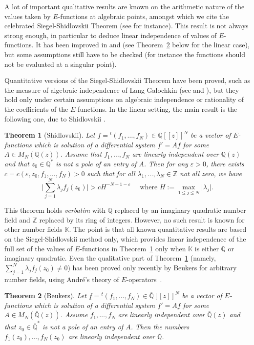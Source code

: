 \documentclass[JEP,XML,SOM,Unicode,published]{cedram}
\newcommand{\lcr}{[\![}
\newcommand{\rcr}{]\!]}
\newcommand{\Efunctions}{$E$\nobreakdash-func\-tions\xspace}
\newtheorem{thmx}{Theorem}
\theoremstyle{definition}
\newcommand{\tra}{{}^t}
\newcommand{\Q}{\mathbb{Q}}
\newcommand{\K}{\mathbb{K}}
\newcommand{\Qbar}{\overline{\mathbb Q}}
\begin{document}
A lot of important qualitative results are known on the arithmetic nature of the values taken by \Efunctions at algebraic points, amongst which we cite the celebrated Siegel-Shidlovskii Theorem (see \cite{Shidlovskiilivre} for instance). This result is not always strong enough, in particular to deduce linear independence of values of \Efunctions. It has been improved in \cite{ns} and \cite{beukers} (see Theorem~\ref{thbeukers} below for the linear case), but some assump\-tions still have to be checked (for instance the functions should not be
evaluated at a singular point).

Quantitative versions of the Siegel-Shidlovskii Theorem have been proved, such as the measure of algebraic independence of Lang-Galochkin (see \cite[p.\,238, Th.\,5.29 \& remarks]{EMS} and \cite[Ch.\,11]{Shidlovskiilivre}), but they hold only under certain assumptions on algebraic independence or rationality of the coefficients of the \Efunctions.
In the linear setting, the main result is the following one, due to Shidlovskii \cite[p.\,358, Th.\,1, Eq.\,(32)]{Shidlovskiilivre}.
\begin{thmx}[Shidlovskii] \label{thshid}
Let $\underline f = \tra (f_1,\ldots, f_N) \in \mathbb{Q}\lcr z\rcr^N$ be a vector of $E$\nobreakdash-func\-tions which is solution of a differential system $\underline f '=A\underline f $ for some $A\in M_N(\Q(z))$. Assume that $f_1,\ldots, f_N$ are linearly independent over $\Q(z)$ and that $z_0\in \mathbb Q^*$ is not a pole of an entry of $A$. Then for any $\varepsilon>0$, there exists $c=c(\varepsilon,z_0,f_1,\ldots,f_N)>0$ such that for all $\lambda_1, \ldots, \lambda_N \in \mathbb Z$ not all zero, we have
\[
\bigg\vert \sum_{j=1}^N \lambda_j f_j(z_0)\bigg\vert > c H^{-N+1-\varepsilon} \quad\mbox{ where } H:=\max_{1\leq j \leq N}\vert\lambda_j\vert.
\]
\end{thmx}
This theorem holds {\em verbatim} with $\mathbb Q$ replaced by an imaginary quadratic number field and $\mathbb Z$ replaced by its ring of integers. However, no such result is known for other number fields $\K$. The point is that all known quantitative results are based on the Siegel-Shidlovskii method only, which provides linear independence of the full set of the values of \Efunctions in Theorem~\ref{thshid} only when $\K$ is either $\Q$ or imaginary quadratic. Even the qualitative part of Theorem~\ref{thshid} (namely, $\sum_{j=1}^N \lambda_j f_j(z_0)\neq 0 $) has been proved only recently by Beukers \cite[Cor.\,1.4]{beukers} for arbitrary number fields, using André's theory of $E$-operators~\cite{andre}.
\begin{thmx}[Beukers] \label{thbeukers}
Let $\underline f = \tra (f_1,\ldots, f_N) \in \Qbar\lcr z\rcr^N$ be a vector of \Efunctions which is solution of a differential system $\underline f '=A\underline f $ for some $A\in M_N(\Qbar(z))$. Assume $f_1,\ldots, f_N$ are linearly independent over $\Qbar(z)$ and that $z_0\in \Qbar^*$ is not a pole of an entry of $A$. Then the numbers $f_1(z_0),\ldots, f_N(z_0)$ are linearly independent over $\Qbar$.
\end{thmx}
\end{document}
